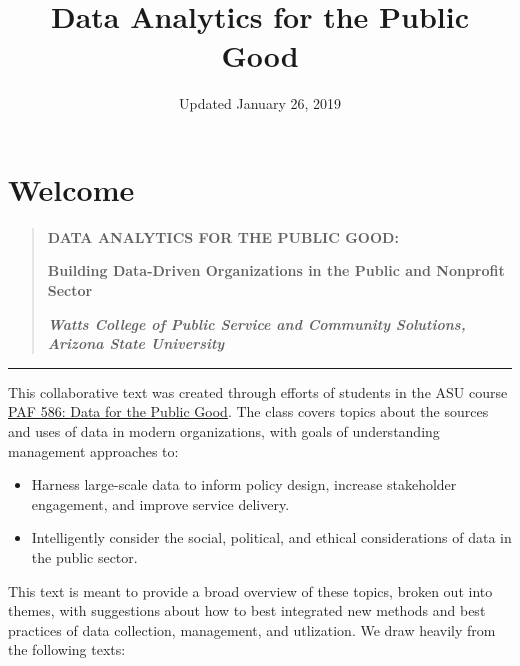 \documentclass[]{book}
\title{Data Analytics for the Public Good}
\author{}
\date{Updated January 26, 2019}
\providecommand{\tightlist}{%
  \setlength{\itemsep}{0pt}\setlength{\parskip}{0pt}}
\begin{document}
\maketitle

{
\setcounter{tocdepth}{1}
\tableofcontents
}
\hypertarget{welcome}{%
\chapter*{Welcome}\label{welcome}}

\begin{quote}
\textbf{DATA ANALYTICS FOR THE PUBLIC GOOD:}

\textbf{Building Data-Driven Organizations in the Public and Nonprofit Sector}

\emph{\textbf{Watts College of Public Service and Community Solutions, Arizona State University}}
\end{quote}

\begin{center}\rule{0.5\linewidth}{\linethickness}\end{center}

This collaborative text was created through efforts of students in the ASU course \href{assets/Syllabus-PAF-586-Spring-2019.pdf}{PAF 586: Data for the Public Good}. The class covers topics about the sources and uses of data in modern organizations, with goals of understanding management approaches to:

\begin{itemize}
\tightlist
\item
  Harness large-scale data to inform policy design, increase stakeholder engagement, and improve service delivery.
\item
  Intelligently consider the social, political, and ethical considerations of data in the public sector.
\end{itemize}

This text is meant to provide a broad overview of these topics, broken out into themes, with suggestions about how to best integrated new methods and best practices of data collection, management, and utlization. We draw heavily from the following texts:
\end{document}
